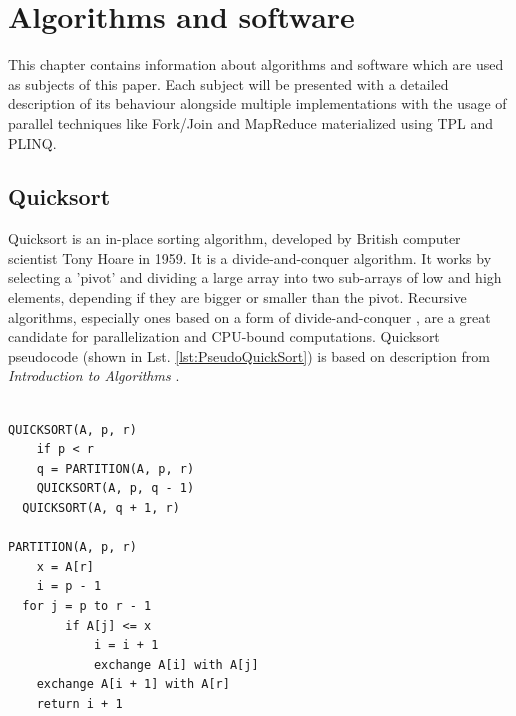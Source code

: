 \chapter{Algorithms and software}
This chapter contains information about algorithms and software which are used as subjects of this paper. Each subject will be presented with a detailed description of its behaviour alongside multiple implementations with the usage of parallel techniques like Fork/Join and MapReduce materialized using TPL and PLINQ.

\section{Quicksort}
Quicksort is an in-place sorting algorithm, developed by British computer scientist Tony Hoare in 1959. It is a divide-and-conquer algorithm. It works by selecting a 'pivot' and dividing a large array into two sub-arrays of low and high elements, depending if they are bigger or smaller than the pivot. Recursive algorithms, especially ones based on a form of divide-and-conquer , are a great candidate for parallelization and CPU-bound computations. Quicksort pseudocode (shown in Lst. \ref{lst:PseudoQuickSort}) is based on description from \emph{Introduction to Algorithms} \cite{Cormen2009}.

\begin{lstlisting}[basicstyle=\ttfamily, caption={Sequential Quicksort pseudocode}, label={lst:PseudoQuickSort}]

QUICKSORT(A, p, r)
	if p < r
	q = PARTITION(A, p, r)
	QUICKSORT(A, p, q - 1)
  QUICKSORT(A, q + 1, r)
	
PARTITION(A, p, r)
	x = A[r]
	i = p - 1
  for j = p to r - 1
		if A[j] <= x
			i = i + 1
			exchange A[i] with A[j]
	exchange A[i + 1] with A[r]
	return i + 1
\end{lstlisting}

